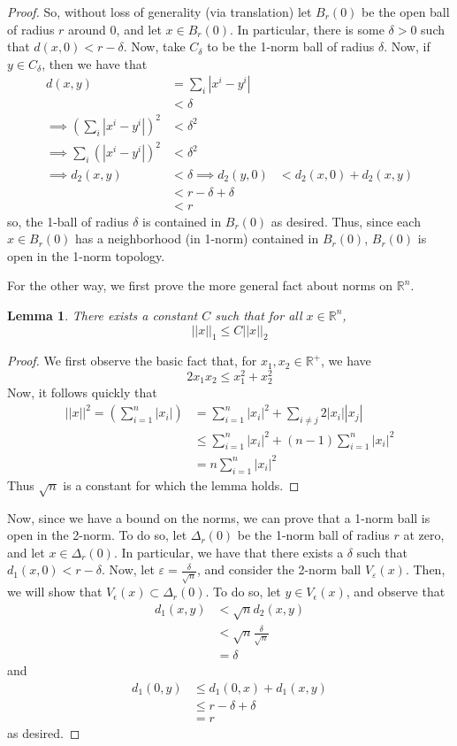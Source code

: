 \documentclass[fontsize=11pt]{scrartcl} %
\numberwithin{equation}{section} %
\numberwithin{figure}{section} %
\numberwithin{table}{section} %
\newcommand{\R}{\mathbb{R}}
\newtheorem{lemma}{Lemma}
\begin{document}
\begin{proof}
So, without loss of generality (via translation) let $B_r(0)$ be the open ball of radius $r$
around $0$, and let $x\in B_r(0)$. In particular, there is some $\delta>0$ such that
$d(x,0)<r-\delta$. Now, take $C_{\delta}$ to be the 1-norm ball
of radius $\delta$.
Now, if $y\in C_{\delta}$, then we have that
\[
\begin{aligned}
d(x,y)  &= \sum_i|x^i-y^i|\\
        &< \delta\\
\implies (\sum_i|x^i-y^i|)^2 &< \delta^2\\
\implies \sum_i(|x^i-y^i|)^2 &< \delta^2\\
\implies d_2(x,y) &< \delta
\implies d_2(y,0) &< d_2(x,0) + d_2(x,y)\\
                    &< r-\delta + \delta\\
                    &< r
\end{aligned}
\]
so, the 1-ball of radius $\delta$ is contained in $B_r(0)$ as desired.
Thus, since each $x\in B_r(0)$ has a neighborhood (in 1-norm) contained in $B_r(0)$,
$B_r(0)$ is open in the 1-norm topology.

For the other way, we first prove the more general fact about norms on $\R^n$.
\begin{lemma}
There exists a constant $C$ such that for all $x\in\R^n$,
\[
||x||_1 \leq C||x||_2
\]
\end{lemma}
\begin{proof}
We first observe the basic fact that, for $x_1,x_2\in\R^+$, we have
\[
2x_1x_2\leq x_1^2+x_2^2
\]
Now, it follows quickly that
\[
\begin{aligned}
||x||^2 = \left(\sum_{i=1}^n |x_i|\right) &= \sum_{i=1}^n |x_i|^2 + \sum_{i\neq j}2|x_i||x_j|\\
                                        &\leq \sum_{i=1}^n |x_i|^2 +(n-1)\sum_{i=1}^n|x_i|^2\\
                                        &= n\sum_{i=1}^n |x_i|^2
\end{aligned}
\]
Thus $\sqrt{n}$ is a constant for which the lemma holds.
\end{proof}
Now, since we have a bound on the norms, we can prove that a 1-norm ball is open in the 2-norm.
To do so, let $\Delta_r(0)$ be the 1-norm ball of radius $r$ at zero, and let
$x\in\Delta_r(0)$. In particular, we have that there exists a $\delta$ such that 
$d_1(x,0)<r-\delta$. Now, let $\varepsilon = \frac{\delta}{\sqrt{n}}$, and consider
the 2-norm ball $V_{\varepsilon}(x)$. Then, we will show that $V_{\epsilon}(x)\subset\Delta_r(0)$.
To do so, let $y\in V_{\epsilon}(x)$, and observe that
\[
\begin{aligned}
d_1(x,y) &<\sqrt{n}d_2(x,y)\\
         &<\sqrt{n}\frac{\delta}{\sqrt{n}}\\
         &=\delta
\end{aligned}
\]
and
\[
\begin{aligned}
d_1(0,y) &\leq d_1(0,x) + d_1(x,y)\\
          &\leq r-\delta + \delta\\
            &= r
\end{aligned}
\]
as desired.
\end{proof}
\end{document}
